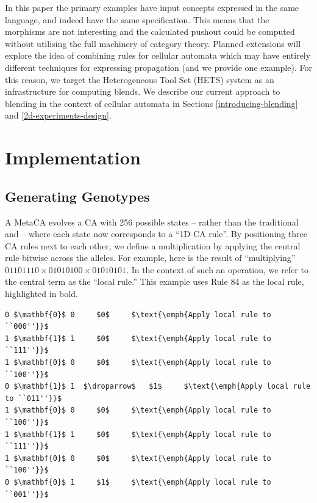 \documentclass{AISB2008}
\makeatletter
\renewcommand{\boxed}[1]{\text{\fboxsep=.2em\fbox{\m@th$\displaystyle#1$}}}
\newcommand{\mystrut}{\vphantom{b\gamma}}
\newcommand{\droparrow}{%
  \mathchoice{\raisebox{-4pt}{$\displaystyle\mapsto$}}
             {\raisebox{-4pt}{$\mapsto$}}
             {\raisebox{-2pt}{$\scriptstyle\mapsto$}}
             {\raisebox{-2pt}{$\scriptscriptstyle\mapsto$}}}
\makeatother
\begin{document}
In this paper the primary examples have input concepts expressed in
the same language, and indeed have the same specification.  This means
that the morphisms are not interesting and the calculated pushout
could be computed without utilising the full machinery of category
theory.  Planned extensions will explore the idea of combining rules
for cellular automata which may have entirely different techniques for
expressing propagation (and we provide one example).  For this reason,
we target the Heterogeneous Tool Set (HETS) system
\cite{mossakowski2007heterogeneous} as an infrastructure for computing
blends.  We describe our current approach to blending in the context
of cellular automata in Sections \ref{introducing-blending} and
\ref{2d-experiments-design}.


\section{Implementation}

\subsection{Generating Genotypes} \label{sec:geno}

A MetaCA evolves a CA with 256 possible
states -- rather than the traditional \boxed{0\mystrut} and \boxed{1\mystrut} -- where each state now
corresponds to a ``1D CA rule''.  By positioning three CA rules next to each
other, we define a multiplication by applying the central rule bitwise
across the alleles.
%
For example, here is the result of ``multiplying'' $01101110\times
01010100\times 01010101$.  In the context of such an operation, we
refer to the central term as the ``local rule.'' 
This example uses Rule 84 as the local rule, highlighted in bold.

\lstset{
  xleftmargin=.1\columnwidth, xrightmargin=.01\columnwidth
}

\begin{lstlisting}[mathescape]
0 $\mathbf{0}$ 0     $0$     $\text{\emph{Apply local rule to ``000''}}$
1 $\mathbf{1}$ 1     $0$     $\text{\emph{Apply local rule to ``111''}}$
1 $\mathbf{0}$ 0     $0$     $\text{\emph{Apply local rule to ``100''}}$
0 $\mathbf{1}$ 1  $\droparrow$   $1$     $\text{\emph{Apply local rule to ``011''}}$
1 $\mathbf{0}$ 0     $0$     $\text{\emph{Apply local rule to ``100''}}$
1 $\mathbf{1}$ 1     $0$     $\text{\emph{Apply local rule to ``111''}}$
1 $\mathbf{0}$ 0     $0$     $\text{\emph{Apply local rule to ``100''}}$
0 $\mathbf{0}$ 1     $1$     $\text{\emph{Apply local rule to ``001''}}$
\end{lstlisting}
\end{document}
